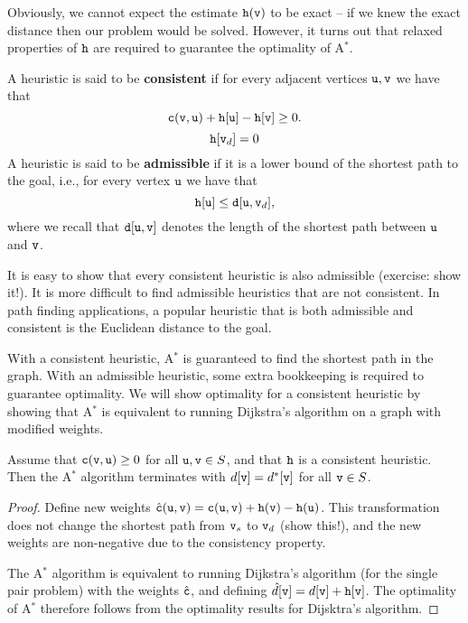 Obviously, we cannot expect the estimate ${\tt h}({\tt v})$ to be exact -- if we knew the exact distance then our problem would be solved. However, it turns out that relaxed properties of ${\tt h}$ are required to guarantee the optimality of A$^*$. 

\begin{definition}
A heuristic is said to be \textbf{consistent} if for every adjacent vertices ${\tt u},{\tt v}$ we have that $${\tt c}({\tt v},{\tt u})+{\tt h}[{\tt u}]-{\tt h}[{\tt v}] \geq 0.$$
$${\tt h}[{\tt v}_d]=0$$  
A heuristic is said to be \textbf{admissible} if it is a lower bound of the shortest path to the goal, i.e., for every vertex ${\tt u}$ we have that $${\tt h}[{\tt u}] \leq {\tt d}[{\tt u},{\tt v}_d],$$
where we recall that ${\tt d}[{\tt u},{\tt v}]$ denotes the length of the shortest path between ${\tt u}$ and ${\tt v}$.
\end{definition}

It is easy to show that every consistent heuristic is also admissible (exercise: show it!). It is more difficult to find admissible heuristics that are not consistent. In path finding applications, a popular heuristic that is both admissible and consistent is the Euclidean distance to the goal.

With a consistent heuristic, A$^*$ is guaranteed to find the shortest path in the graph. With an admissible heuristic, some extra bookkeeping is required to guarantee optimality. 
We will show optimality for a consistent heuristic by showing that A$^*$ is equivalent to running Dijkstra's algorithm on a graph with modified weights.

\begin{proposition}\label{prop:astar_complete}
    Assume that ${\tt c}({\tt v},{\tt u})\geq 0$ for all ${\tt u},{\tt v}\in{S}$, and that ${\tt h}$ is a consistent heuristic. Then the A$^*$ algorithm terminates with $d[{\tt v}] = d^*[{\tt v}]$ for all ${\tt v}\in{S}$.
\end{proposition}
\begin{proof}
Define new weights $\hat{{\tt c}}({\tt u},{\tt v}) = {\tt c}({\tt u},{\tt v}) + {\tt h}({\tt v}) - {\tt h}({\tt u})$. This transformation does not change the shortest path from ${\tt v}_s$ to ${\tt v}_d$ (show this!), and the new weights are non-negative due to the consistency property.

The A$^*$ algorithm is equivalent to running Dijkstra's algorithm (for the single pair problem) with the weights $\hat{{\tt c}}$, and defining $\hat{d}[{\tt v}] = d[{\tt v}] + {\tt h}[{\tt v}]$. The optimality of A$^*$ therefore follows from the optimality results for Dijsktra's algorithm.
\end{proof}

